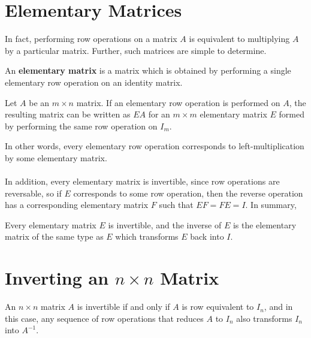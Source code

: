 \documentclass[letterpaper,12pt]{article}
\begin{document}
\section*{Elementary Matrices}
In fact, performing row operations on a matrix $A$ is equivalent to multiplying $A$ by a particular matrix. Further, such matrices are simple to determine.

\begin{definition}
An \textbf{elementary matrix} is a matrix which is obtained by performing a single elementary row operation on an identity matrix.
\end{definition}

\begin{theorem}
Let $A$ be an $m \times n$ matrix. If an elementary row operation is performed on $A$, the resulting matrix can be written as $EA$ for an $m \times m$ elementary matrix $E$ formed by performing the same row operation on $I_m$.
\end{theorem}

In other words, every elementary row operation corresponds to left-multiplication by some elementary matrix.
\\ \\ In addition, every elementary matrix is invertible, since row operations are reversable, so if $E$ corresponds to some row operation, then the reverse operation has a corresponding elementary matrix $F$ such that $EF = FE = I$. In summary,

\begin{theorem}
Every elementary matrix $E$ is invertible, and the inverse of $E$ is the elementary matrix of the same type as $E$ which transforms $E$ back into $I$.
\end{theorem}


\section*{Inverting an $n \times n$ Matrix}
\begin{theorem}
An $n \times n$ matrix $A$ is invertible if and only if $A$ is row equivalent to $I_n$, and in this case, any sequence of row operations that reduces $A$ to $I_n$ also transforms $I_n$ into $A^{-1}$.
\end{theorem}
\end{document}
